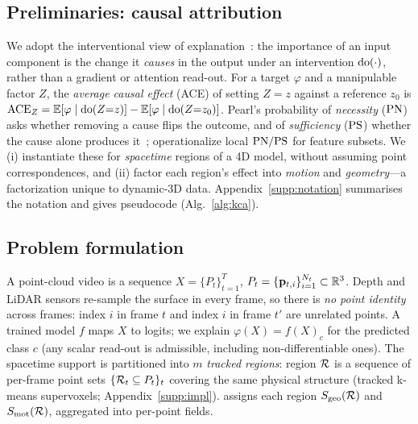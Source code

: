 \subsection{Preliminaries: causal attribution}
\label{sec:method-prelim}
We adopt the interventional view of explanation~\cite{watson2021lens,janzing2020feature,pearl2009causality}: the importance of an input component is the change it \emph{causes} in the output under an intervention $\mathrm{do}(\cdot)$, rather than a gradient or attention read-out. For a target $\varphi$ and a manipulable factor $Z$, the \emph{average causal effect} (ACE) of setting $Z{=}z$ against a reference $z_0$ is $\mathrm{ACE}_Z = \operatorname{\mathbb{E}}[\varphi\mid \mathrm{do}(Z{=}z)]-\operatorname{\mathbb{E}}[\varphi\mid \mathrm{do}(Z{=}z_0)]$. Pearl's probability of \emph{necessity} ($\mathrm{PN}$) asks whether removing a cause flips the outcome, and of \emph{sufficiency} ($\mathrm{PS}$) whether the cause alone produces it~\cite{pearl2009causality}; \citet{watson2021lens} operationalize local $\mathrm{PN}/\mathrm{PS}$ for feature subsets. We (i) instantiate these for \emph{spacetime} regions of a 4D model, without assuming point correspondences, and (ii) factor each region's effect into \emph{motion} and \emph{geometry}---a factorization unique to dynamic-3D data. Appendix~\ref{supp:notation} summarises the notation and gives pseudocode (Alg.~\ref{alg:kca}).


\subsection{Problem formulation}
\label{sec:method-setup}
A point-cloud video is a sequence $X=\{P_t\}_{t=1}^{T}$, $P_t=\{\mathbf{p}_{t,i}\}_{i=1}^{N_t}\subset\mathbb{R}^{3}$. Depth and LiDAR sensors re-sample the surface in every frame, so there is \emph{no point identity} across frames: index $i$ in frame $t$ and index $i$ in frame $t'$ are unrelated points. A trained model $f$ maps $X$ to logits; we explain $\varphi(X)=f(X)_c$ for the predicted class $c$ (any scalar read-out is admissible, including non-differentiable ones). The spacetime support is partitioned into $m$ \emph{tracked regions}: region $\mathcal{R}$ is a sequence of per-frame point sets $\{\mathcal{R}_t\subseteq P_t\}_t$ covering the same physical structure (tracked k-means supervoxels; Appendix~\ref{supp:impl}). \method assigns each region $S_{\mathrm{geo}}(\mathcal{R})$ and $S_{\mathrm{mot}}(\mathcal{R})$, aggregated into per-point fields.

